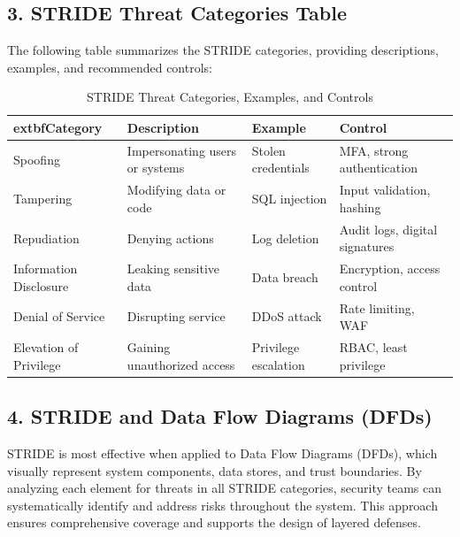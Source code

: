 \subsection*{3. STRIDE Threat Categories Table}
The following table summarizes the STRIDE categories, providing descriptions, examples, and recommended controls:
\begin{table}[H]
\centering
\begin{tabular}{|l|l|l|l|}
\hline
		extbf{Category} & \textbf{Description} & \textbf{Example} & \textbf{Control} \\
\hline
Spoofing & Impersonating users or systems & Stolen credentials & MFA, strong authentication \\
Tampering & Modifying data or code & SQL injection & Input validation, hashing \\
Repudiation & Denying actions & Log deletion & Audit logs, digital signatures \\
Information Disclosure & Leaking sensitive data & Data breach & Encryption, access control \\
Denial of Service & Disrupting service & DDoS attack & Rate limiting, WAF \\
Elevation of Privilege & Gaining unauthorized access & Privilege escalation & RBAC, least privilege \\
\hline
\end{tabular}
\caption{STRIDE Threat Categories, Examples, and Controls\cite{shostack2014,owasp}}
\end{table}

\subsection*{4. STRIDE and Data Flow Diagrams (DFDs)}
STRIDE is most effective when applied to Data Flow Diagrams (DFDs), which visually represent system components, data stores, and trust boundaries. By analyzing each element for threats in all STRIDE categories, security teams can systematically identify and address risks throughout the system\cite{shostack2014}. This approach ensures comprehensive coverage and supports the design of layered defenses.

